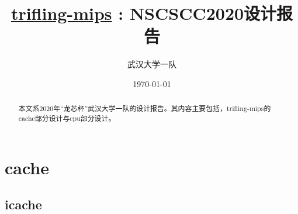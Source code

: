 \documentclass[lang=cn,11pt]{elegantpaper}
\title{\href{https://github.com/trifling-mips/trifling-mips}{trifling-mips} : NSCSCC2020设计报告}
\author{武汉大学一队}
\date{\today}
\begin{document}
\maketitle

\begin{abstract}
本文系2020年“龙芯杯”武汉大学一队的设计报告。其内容主要包括，trifling-mips的cache部分设计与cpu部分设计。
\end{abstract}


\section{cache}
      
\subsection{icache}
\end{document}

